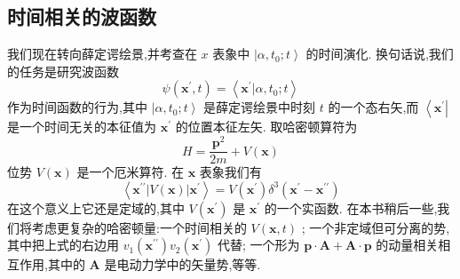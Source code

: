 \subsection{时间相关的波函数}
我们现在转向薛定谔绘景,并考查在 $x$ 表象中 $\left| {\alpha ,{t}_{0};t}\right\rangle$ 的时间演化. 换句话说,我们的任务是研究波函数
\begin{equation}
\psi \left( {{\mathbf{x}}^{\prime }, t}\right) = \left\langle {{\mathbf{x}}^{\prime } | \alpha ,{t}_{0};t}\right\rangle
\end{equation}
作为时间函数的行为,其中 $\left| {\alpha ,{t}_{0};t}\right\rangle$ 是薛定谔绘景中时刻 $t$ 的一个态右矢,而 $\left\langle {\mathbf{x}}^{\prime }\right|$ 是一个时间无关的本征值为 ${\mathbf{x}}^{\prime }$ 的位置本征左矢. 取哈密顿算符为
\begin{equation}
H = \frac{{\mathbf{p}}^{2}}{2m} + V\left( \mathbf{x}\right)
\end{equation}
位势 $V\left( \mathbf{x}\right)$ 是一个厄米算符. 在 $\mathbf{x}$ 表象我们有
\begin{equation}
\left\langle {{\mathbf{x}}^{\prime \prime }\left| {V\left( \mathbf{x}\right) }\right| {\mathbf{x}}^{\prime }}\right\rangle = V\left( {\mathbf{x}}^{\prime }\right) {\delta }^{3}\left( {{\mathbf{x}}^{\prime } - {\mathbf{x}}^{\prime \prime }}\right)
\end{equation}
在这个意义上它还是定域的,其中 $V\left( {\mathbf{x}}^{\prime }\right)$ 是 ${\mathbf{x}}^{\prime }$ 的一个实函数. 在本书稍后一些,我们将考虑更复杂的哈密顿量:一个时间相关的 $V\left( {\mathbf{x}, t}\right)$ ; 一个非定域但可分离的势,其中把上式的右边用 ${v}_{1}\left( {\mathbf{x}}^{\prime \prime }\right) {v}_{2}\left( {\mathbf{x}}^{\prime }\right)$ 代替; 一个形为 $\mathbf{p} \cdot \mathbf{A} + \mathbf{A} \cdot \mathbf{p}$ 的动量相关相互作用,其中的 $\mathbf{A}$ 是电动力学中的矢量势,等等.

